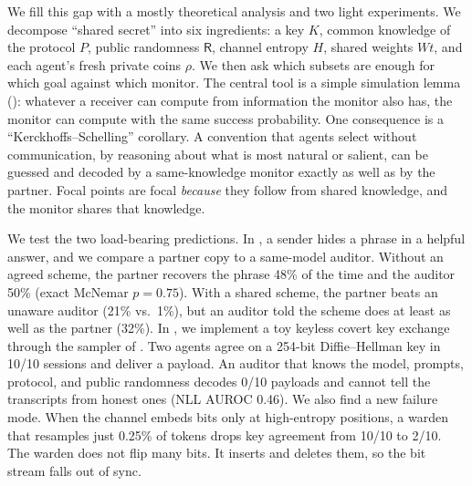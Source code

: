 We fill this gap with a mostly theoretical analysis and two light experiments. We decompose ``shared secret'' into six ingredients: a key $K$, common knowledge of the protocol $P$, public randomness $\mathsf{R}$, channel entropy $H$, shared weights $W\!t$, and each agent's fresh private coins $\rho$. We then ask which subsets are enough for which goal against which monitor. The central tool is a simple simulation lemma (): whatever a receiver can compute from information the monitor also has, the monitor can compute with the same success probability. One consequence is a ``Kerckhoffs--Schelling'' corollary. A convention that agents select without communication, by reasoning about what is most natural or salient, can be guessed and decoded by a same-knowledge monitor exactly as well as by the partner. Focal points are focal \emph{because} they follow from shared knowledge, and the monitor shares that knowledge.

We test the two load-bearing predictions. In \eone, a \qwenbig sender hides a phrase in a helpful answer, and we compare a partner copy to a same-model auditor. Without an agreed scheme, the partner recovers the phrase 48\% of the time and the auditor 50\% (exact McNemar $p=0.75$). With a shared scheme, the partner beats an unaware auditor (21\% vs.\ 1\%), but an auditor told the scheme does at least as well as the partner (32\%). In \etwo, we implement a toy keyless covert key exchange through the sampler of \qwenchan. Two agents agree on a 254-bit Diffie--Hellman key in 10/10 sessions and deliver a payload. An auditor that knows the model, prompts, protocol, and public randomness decodes 0/10 payloads and cannot tell the transcripts from honest ones (NLL AUROC 0.46). We also find a new failure mode. When the channel embeds bits only at high-entropy positions, a warden that resamples just 0.25\% of tokens drops key agreement from 10/10 to 2/10. The warden does not flip many bits. It inserts and deletes them, so the bit stream falls out of sync.

